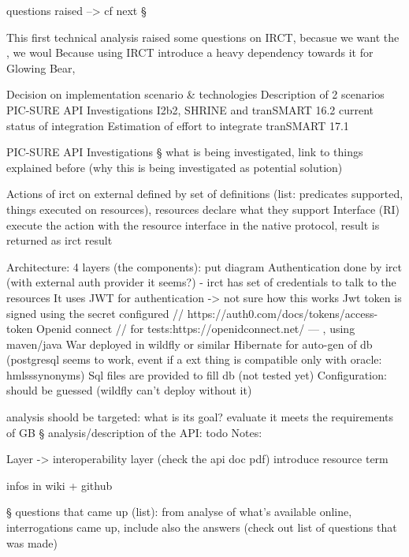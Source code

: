 questions raised --> cf next §

This first technical analysis raised some questions on IRCT, becasue we want the , we woul
Because using IRCT introduce a heavy dependency towards it for Glowing Bear, 


Decision on implementation scenario \& technologies
Description of 2 scenarios
PIC-SURE API Investigations
I2b2, SHRINE and tranSMART 16.2 current status of integration
Estimation of effort to integrate tranSMART 17.1


PIC-SURE API Investigations
§ what is being investigated, link to things explained before (why this is being investigated as potential solution)

Actions of irct on external defined by set of definitions (list: predicates supported, things executed on resources), resources declare what they support
Interface (RI) execute the action with the resource interface in the native protocol, result is returned as irct result

Architecture: 4 layers (the components): put diagram
Authentication done by irct (with external auth provider it seems?) - irct has set of credentials to talk to the resources 
It uses JWT for authentication -> not sure how this works
Jwt token is signed using the secret configured // https://auth0.com/docs/tokens/access-token
Openid connect // for tests:https://openidconnect.net/
---
, using maven/java
War deployed in wildfly or similar
Hibernate for auto-gen of db (postgresql seems to work, event if a ext thing is compatible only with oracle: hmlsssynonyms)
Sql files are provided to fill db (not tested yet)
Configuration: should be guessed (wildfly can’t deploy without it)


analysis shoold be targeted: what is its goal? evaluate it meets the requirements of GB
§ analysis/description of the API: todo %
Notes:

Layer -> interoperability layer (check the api doc pdf)
introduce resource term

infos in wiki + github

§ questions that came up (list): from analyse of what’s available online, interrogations came up, include also the answers (check out list of questions that was made)

